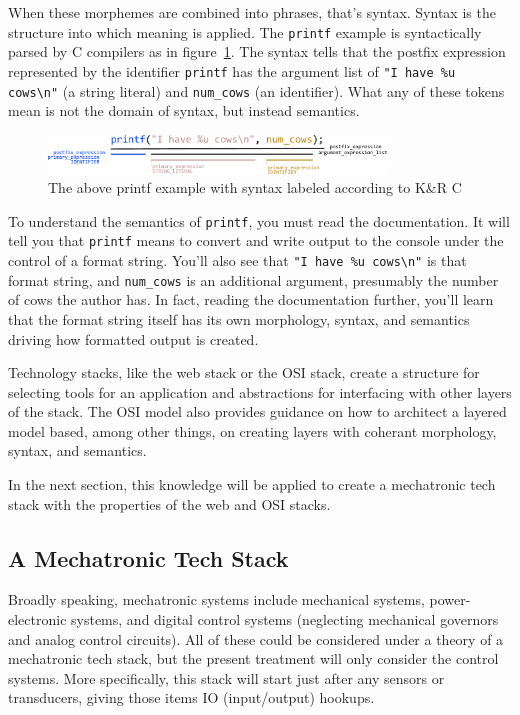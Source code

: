 \documentclass[english,12pt,a4paper,pdftex,eng,utf8]{aaltothesis}
\begin{document}
When these morphemes are combined into phrases, that's syntax.  Syntax is the structure into which meaning is applied.  The \verb|printf| example is syntactically parsed by C compilers as in figure~\ref{fig:printf_syntax}.  The syntax tells that the postfix expression represented by the identifier \verb|printf| has the argument list of \verb|"I have %u cows\n"| (a string literal) and \verb|num_cows| (an identifier).  What any of these tokens mean is not the domain of syntax, but instead semantics.

\begin{figure}[h]
  \centering
  \includegraphics[width=0.8\textwidth]{assets/printf_syntax}
  \caption{The above printf example with syntax labeled according to K{\&}R C~\cite{Kernighan1978}}\label{fig:printf_syntax}
\end{figure}

To understand the semantics of \verb|printf|, you must read the documentation.  It will tell you that \verb|printf| means to convert and write output to the console under the control of a format string.  You'll also see that \verb|"I have %u cows\n"| is that format string, and \verb|num_cows| is an additional argument, presumably the number of cows the author has.  In fact, reading the documentation further, you'll learn that the format string itself has its own morphology, syntax, and semantics driving how formatted output is created.

Technology stacks, like the web stack or the OSI stack, create a structure for selecting tools for an application and abstractions for interfacing with other layers of the stack.  The OSI model also provides guidance on how to architect a layered model based, among other things, on creating layers with coherant morphology, syntax, and semantics.

In the next section, this knowledge will be applied to create a mechatronic tech stack with the properties of the web and OSI stacks.

\subsection{A Mechatronic Tech Stack}

Broadly speaking, mechatronic systems include mechanical systems, power-electronic systems, and digital control systems (neglecting mechanical governors and analog control circuits).  All of these could be considered under a theory of a mechatronic tech stack, but the present treatment will only consider the control systems.  More specifically, this stack will start just after any sensors or transducers, giving those items IO (input/output) hookups.
\end{document}
